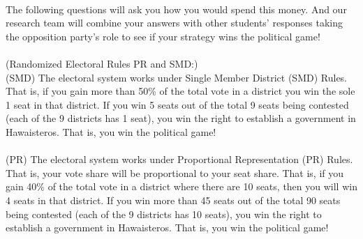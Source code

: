 \documentclass{article}
\begin{document}
\\
The following questions will ask you how you would spend this money. And our research team will combine your answers with other students' responses taking the opposition party's role to see if your strategy wins the political game!\\
\\
(Randomized Electoral Rules PR and SMD:)\\
(SMD) The electoral system works under Single Member District (SMD) Rules. That is, if you gain more than 50\% of the total vote in a district you win the sole 1 seat in that district. If you win 5 seats out of the total 9 seats being contested (each of the 9 districts has 1 seat), you win the right to establish a government in Hawaisteros. That is, you win the political game!\\
\\
(PR) The electoral system works under Proportional Representation (PR) Rules. That is, your vote share will be proportional to your seat share. That is, if you gain 40\% of the total vote in a district where there are 10 seats, then you will win 4 seats in that district. If you win more than 45 seats out of the total 90 seats being contested (each of the 9 districts has 10 seats), you win the right to establish a government in Hawaisteros. That is, you win the political game!
\end{document}
